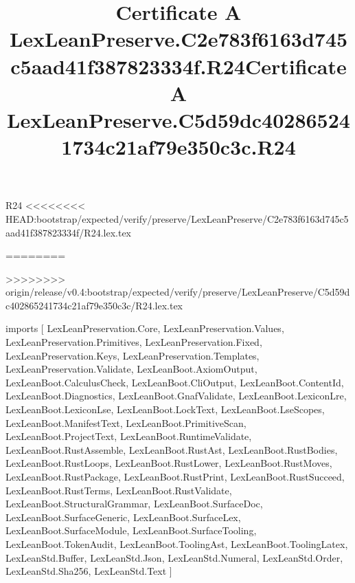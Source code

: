 \begin{lexlean}{R24}
<<<<<<<< HEAD:bootstrap/expected/verify/preserve/LexLeanPreserve/C2e783f6163d745c5aad41f387823334f/R24.lex.tex
\title{Certificate A LexLeanPreserve.C2e783f6163d745c5aad41f387823334f.R24}
========
\title{Certificate A LexLeanPreserve.C5d59dc402865241734c21af79e350c3c.R24}
>>>>>>>> origin/release/v0.4:bootstrap/expected/verify/preserve/LexLeanPreserve/C5d59dc402865241734c21af79e350c3c/R24.lex.tex
\begin{coremodule}
imports [
  LexLeanPreservation.Core,
  LexLeanPreservation.Values,
  LexLeanPreservation.Primitives,
  LexLeanPreservation.Fixed,
  LexLeanPreservation.Keys,
  LexLeanPreservation.Templates,
  LexLeanPreservation.Validate,
  LexLeanBoot.AxiomOutput,
  LexLeanBoot.CalculusCheck,
  LexLeanBoot.CliOutput,
  LexLeanBoot.ContentId,
  LexLeanBoot.Diagnostics,
  LexLeanBoot.GnafValidate,
  LexLeanBoot.LexiconLre,
  LexLeanBoot.LexiconLse,
  LexLeanBoot.LockText,
  LexLeanBoot.LseScopes,
  LexLeanBoot.ManifestText,
  LexLeanBoot.PrimitiveScan,
  LexLeanBoot.ProjectText,
  LexLeanBoot.RuntimeValidate,
  LexLeanBoot.RustAssemble,
  LexLeanBoot.RustAst,
  LexLeanBoot.RustBodies,
  LexLeanBoot.RustLoops,
  LexLeanBoot.RustLower,
  LexLeanBoot.RustMoves,
  LexLeanBoot.RustPackage,
  LexLeanBoot.RustPrint,
  LexLeanBoot.RustSucceed,
  LexLeanBoot.RustTerms,
  LexLeanBoot.RustValidate,
  LexLeanBoot.StructuralGrammar,
  LexLeanBoot.SurfaceDoc,
  LexLeanBoot.SurfaceGeneric,
  LexLeanBoot.SurfaceLex,
  LexLeanBoot.SurfaceModule,
  LexLeanBoot.SurfaceTooling,
  LexLeanBoot.TokenAudit,
  LexLeanBoot.ToolingAst,
  LexLeanBoot.ToolingLatex,
  LexLeanStd.Buffer,
  LexLeanStd.Json,
  LexLeanStd.Numeral,
  LexLeanStd.Order,
  LexLeanStd.Sha256,
  LexLeanStd.Text
]


\end{coremodule}
\end{lexlean}
